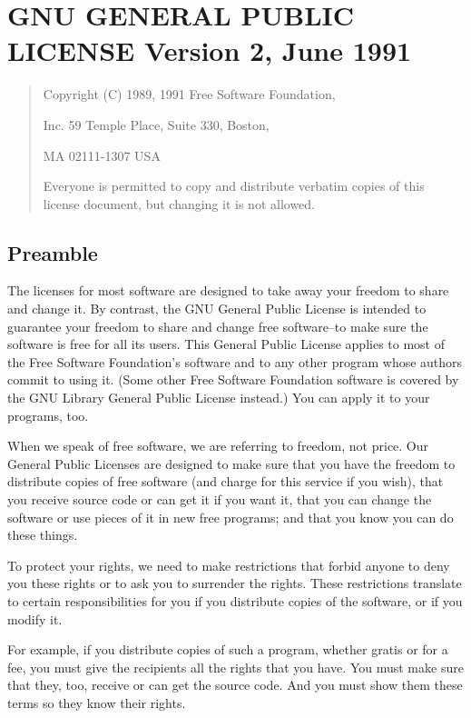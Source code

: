 \documentclass[english,letterpaper]{book}
\begin{document}
\section*{GNU GENERAL PUBLIC LICENSE Version 2, June 1991}

\begin{quote}
Copyright (C) 1989, 1991 Free Software Foundation,

Inc. 59 Temple Place, Suite 330, Boston, 

MA 02111-1307 USA

Everyone is permitted to copy and distribute verbatim copies of this
license document, but changing it is not allowed.
\end{quote}

\subsection*{Preamble}

The licenses for most software are designed to take away your freedom
to share and change it. By contrast, the GNU General Public License
is intended to guarantee your freedom to share and change free software--to
make sure the software is free for all its users. This General Public
License applies to most of the Free Software Foundation's software
and to any other program whose authors commit to using it. (Some other
Free Software Foundation software is covered by the GNU Library General
Public License instead.) You can apply it to your programs, too.

When we speak of free software, we are referring to freedom, not price.
Our General Public Licenses are designed to make sure that you have
the freedom to distribute copies of free software (and charge for
this service if you wish), that you receive source code or can get
it if you want it, that you can change the software or use pieces
of it in new free programs; and that you know you can do these things.

To protect your rights, we need to make restrictions that forbid anyone
to deny you these rights or to ask you to surrender the rights. These
restrictions translate to certain responsibilities for you if you
distribute copies of the software, or if you modify it.

For example, if you distribute copies of such a program, whether gratis
or for a fee, you must give the recipients all the rights that you
have. You must make sure that they, too, receive or can get the source
code. And you must show them these terms so they know their rights.
\end{document}
